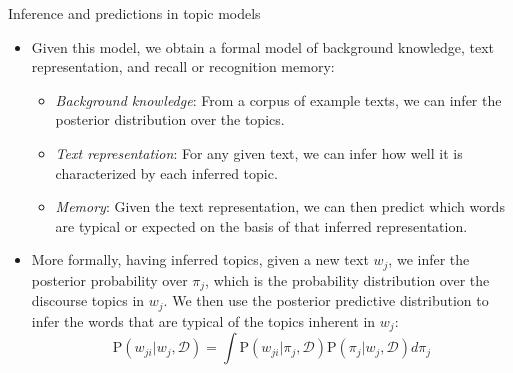 \documentclass[10pt,ignorenonframetext,]{beamer}
\providecommand{\tightlist}{%
  \setlength{\itemsep}{0pt}\setlength{\parskip}{0pt}}
\newcommand{\Prob}[1]{\mathrm{P}( #1 )}
\newcommand*{\given}{\vert}
\newcommand{\wnew}{w_{j}}
\newcommand{\wjinew}{w_{ji}}
\newcommand{\pinew}{\pi_{j}}
\newcommand{\data}{\mathcal{D}}
\begin{document}
\begin{frame}{Inference and predictions in topic models}
\protect\hypertarget{inference-and-predictions-in-topic-models}{}

\begin{itemize}
\item
  Given this model, we obtain a formal model of background knowledge,
  text representation, and recall or recognition memory:

  \begin{itemize}
  \tightlist
  \item
    \emph{Background knowledge}: From a corpus of example texts, we can
    infer the posterior distribution over the topics.
  \item
    \emph{Text representation}: For any given text, we can infer how
    well it is characterized by each inferred topic.
  \item
    \emph{Memory}: Given the text representation, we can then predict
    which words are typical or expected on the basis of that inferred
    representation.
  \end{itemize}
\item
  More formally, having inferred topics, given a new text \(\wnew\), we
  infer the posterior probability over \(\pinew\), which is the
  probability distribution over the discourse topics in \(\wnew\). We
  then use the posterior predictive distribution to infer the words that
  are typical of the topics inherent in \(\wnew\): \[
    \Prob{\wjinew \given \wnew,\data} = \int \Prob{\wjinew \given \pinew, \data}\Prob{\pinew \given \wnew, \data} d\pinew
  \]
\end{itemize}

\end{frame}
\end{document}
